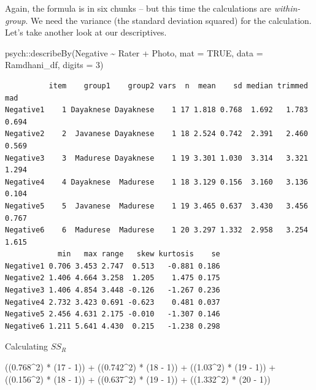 \documentclass[
  11pt,
]{book}
\newenvironment{Shaded}{\begin{snugshade}}{\end{snugshade}}
\newcommand{\AttributeTok}[1]{\textcolor[rgb]{0.77,0.63,0.00}{#1}}
\newcommand{\ConstantTok}[1]{\textcolor[rgb]{0.00,0.00,0.00}{#1}}
\newcommand{\DecValTok}[1]{\textcolor[rgb]{0.00,0.00,0.81}{#1}}
\newcommand{\FloatTok}[1]{\textcolor[rgb]{0.00,0.00,0.81}{#1}}
\newcommand{\FunctionTok}[1]{\textcolor[rgb]{0.00,0.00,0.00}{#1}}
\newcommand{\NormalTok}[1]{#1}
\newcommand{\SpecialCharTok}[1]{\textcolor[rgb]{0.00,0.00,0.00}{#1}}
\begin{document}
Again, the formula is in six chunks -- but this time the calculations are \emph{within-group}. We need the variance (the standard deviation squared) for the calculation. Let's take another look at our descriptives.

\begin{Shaded}
\begin{Highlighting}[]
\NormalTok{psych}\SpecialCharTok{::}\FunctionTok{describeBy}\NormalTok{(Negative }\SpecialCharTok{\textasciitilde{}}\NormalTok{ Rater }\SpecialCharTok{+}\NormalTok{ Photo, }\AttributeTok{mat =} \ConstantTok{TRUE}\NormalTok{, }\AttributeTok{data =}\NormalTok{ Ramdhani\_df,}
    \AttributeTok{digits =} \DecValTok{3}\NormalTok{)}
\end{Highlighting}
\end{Shaded}

\begin{verbatim}
          item    group1    group2 vars  n  mean    sd median trimmed   mad
Negative1    1 Dayaknese Dayaknese    1 17 1.818 0.768  1.692   1.783 0.694
Negative2    2  Javanese Dayaknese    1 18 2.524 0.742  2.391   2.460 0.569
Negative3    3  Madurese Dayaknese    1 19 3.301 1.030  3.314   3.321 1.294
Negative4    4 Dayaknese  Madurese    1 18 3.129 0.156  3.160   3.136 0.104
Negative5    5  Javanese  Madurese    1 19 3.465 0.637  3.430   3.456 0.767
Negative6    6  Madurese  Madurese    1 20 3.297 1.332  2.958   3.254 1.615
            min   max range   skew kurtosis    se
Negative1 0.706 3.453 2.747  0.513   -0.881 0.186
Negative2 1.406 4.664 3.258  1.205    1.475 0.175
Negative3 1.406 4.854 3.448 -0.126   -1.267 0.236
Negative4 2.732 3.423 0.691 -0.623    0.481 0.037
Negative5 2.456 4.631 2.175 -0.010   -1.307 0.146
Negative6 1.211 5.641 4.430  0.215   -1.238 0.298
\end{verbatim}

Calculating \(SS_R\)

\begin{Shaded}
\begin{Highlighting}[]
\NormalTok{((}\FloatTok{0.768}\SpecialCharTok{\^{}}\DecValTok{2}\NormalTok{) }\SpecialCharTok{*}\NormalTok{ (}\DecValTok{17} \SpecialCharTok{{-}} \DecValTok{1}\NormalTok{)) }\SpecialCharTok{+}\NormalTok{ ((}\FloatTok{0.742}\SpecialCharTok{\^{}}\DecValTok{2}\NormalTok{) }\SpecialCharTok{*}\NormalTok{ (}\DecValTok{18} \SpecialCharTok{{-}} \DecValTok{1}\NormalTok{)) }\SpecialCharTok{+}\NormalTok{ ((}\FloatTok{1.03}\SpecialCharTok{\^{}}\DecValTok{2}\NormalTok{) }\SpecialCharTok{*}\NormalTok{ (}\DecValTok{19} \SpecialCharTok{{-}} \DecValTok{1}\NormalTok{)) }\SpecialCharTok{+}
\NormalTok{    ((}\FloatTok{0.156}\SpecialCharTok{\^{}}\DecValTok{2}\NormalTok{) }\SpecialCharTok{*}\NormalTok{ (}\DecValTok{18} \SpecialCharTok{{-}} \DecValTok{1}\NormalTok{)) }\SpecialCharTok{+}\NormalTok{ ((}\FloatTok{0.637}\SpecialCharTok{\^{}}\DecValTok{2}\NormalTok{) }\SpecialCharTok{*}\NormalTok{ (}\DecValTok{19} \SpecialCharTok{{-}} \DecValTok{1}\NormalTok{)) }\SpecialCharTok{+}\NormalTok{ ((}\FloatTok{1.332}\SpecialCharTok{\^{}}\DecValTok{2}\NormalTok{) }\SpecialCharTok{*}\NormalTok{ (}\DecValTok{20} \SpecialCharTok{{-}}
    \DecValTok{1}\NormalTok{))}
\end{Highlighting}
\end{Shaded}
\end{document}
